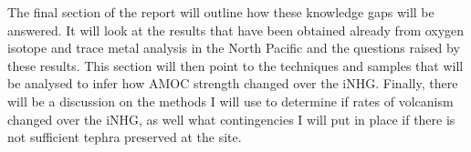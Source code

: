 The final section of the report will outline how these knowledge gaps will be answered. It will look at the results that have been obtained already from oxygen isotope and trace metal analysis in the North Pacific and the questions raised by these results. This section will then point to the techniques and samples that will be analysed to infer how AMOC strength changed over the iNHG. Finally, there will be a discussion on the methods I will use to determine if rates of volcanism changed over the iNHG, as well what contingencies I will put in place if there is not sufficient tephra preserved at the site.  





